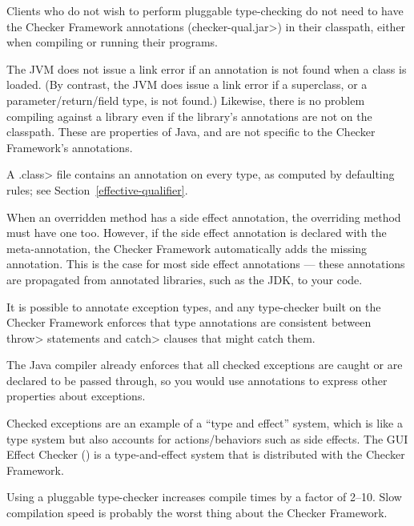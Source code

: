 Clients who do not wish to perform pluggable type-checking do not need to
have the Checker Framework annotations
(\<checker-qual.jar>) in their classpath, either when compiling or running
their programs.

The JVM does not issue a link error if an annotation is not found when a
class is loaded.  (By contrast, the JVM does issue a link error if a
superclass, or a parameter/return/field type, is not found.)
Likewise, there is no problem compiling against a library even if the
library's annotations are not on the classpath.
These are properties of Java, and are not specific to the Checker
Framework's annotations.



A \<.class> file contains an annotation on every type, as computed by
defaulting rules; see Section~\ref{effective-qualifier}.

When an overridden method has a side effect annotation, the overriding
method must have one too.  However, if the side effect annotation is
declared with the 
meta-annotation, the Checker Framework automatically adds the missing
annotation.  This is the case for most side effect annotations --- these
annotations are propagated from annotated libraries, such as the JDK, to
your code.



It is possible to annotate exception types, and any type-checker built on the
Checker Framework enforces that type annotations are consistent between
\<throw> statements and \<catch> clauses that might catch them.

The Java compiler already enforces that all checked exceptions are caught
or are declared to be passed through, so you would use annotations to
express other properties about exceptions.

Checked exceptions are an example of a ``type and effect'' system, which is
like a type system but also accounts for actions/behaviors such as side
effects.  The GUI Effect Checker () is a
type-and-effect system that is distributed with the Checker Framework.



Using a pluggable type-checker increases compile times by a factor of 2--10.
Slow compilation speed is probably the worst thing about the Checker
Framework.

